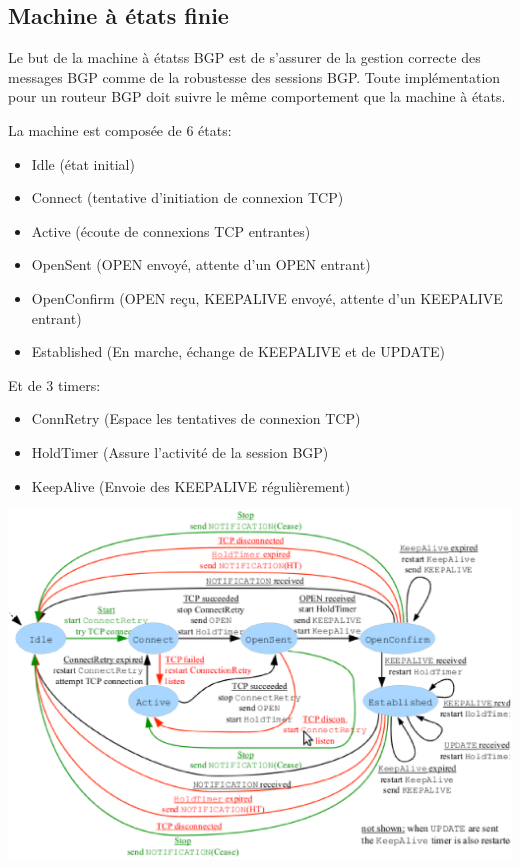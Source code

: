 \documentclass{report}
\begin{document}
\subsection{Machine à états finie}

Le but de la machine à étatss BGP est de s'assurer de la gestion
correcte des messages BGP comme de la robustesse des sessions
BGP. Toute implémentation pour un routeur BGP doit suivre le même
comportement que la machine à états.

La machine est composée de 6 états:

\begin{itemize}
\item Idle (état initial)
\item Connect (tentative d'initiation de connexion TCP)
\item Active (écoute de connexions TCP entrantes)
\item OpenSent (OPEN envoyé, attente d'un OPEN entrant)
\item OpenConfirm (OPEN reçu, KEEPALIVE envoyé, attente d'un KEEPALIVE
  entrant)
\item Established (En marche, échange de KEEPALIVE et de UPDATE)
\end{itemize}

Et de 3 timers:

\begin{itemize}
\item ConnRetry (Espace les tentatives de connexion TCP)
\item HoldTimer (Assure l'activité de la session BGP)
\item KeepAlive (Envoie des KEEPALIVE régulièrement)
\end{itemize}

\includegraphics[width=\textwidth]{bgpmachine.eps}
\end{document}
